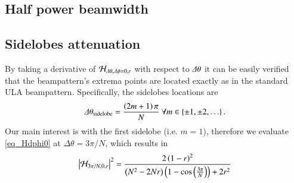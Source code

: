 \subsection*{Half power beamwidth}

\subsection*{Sidelobes attenuation}
\ifdefined\showDev
\else
\fi
By taking a derivative of $\Hr_{\Delta\theta,\Delta\phi=0,r}\omegaB$ with respect to $\dTheta$ it can be easily verified that the beampattern's extrema points are located exactly as in the standard ULA beampattern. Specifically, the sidelobes locations are
\begin{equation}
    \label{eqn_CB_sidelobesLocations}
    \Delta\theta_{\text{sidelobe}} = \frac{\rBrace{2m+1}\pi}{N}\ \forall m\in\cBrace{\pm 1,\pm 2,\hdots}.
\end{equation}
Our main interest is with the first sidelobe (i.e. $m=1$), therefore we evaluate \eqref{eq_Hdphi0} at $\Delta\theta = 3\pi/N$, which results in
\begin{equation}
    \abs{\Hr_{{3\pi}/{N},0,r}\omegaB}^2
    =
    \frac{
    2\rBrace{1-r}^{2}
    }{
    \rBrace{N^{2}-2Nr}\rBrace{1-\cos{\rBrace{\frac{3\pi}{N}}}}+2r^{2}
    }
    \label{eq_HSidelobes}
\end{equation}
